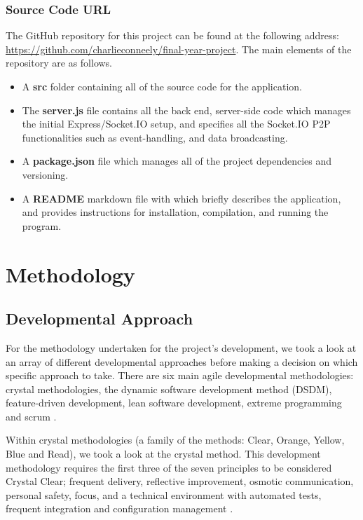 \subsection{Source Code URL} 
The GitHub repository for this project can be found at the following address: \href{https://github.com/charlieconneely/final-year-project}{https://github.com/charlieconneely/final-year-project}. \newline 
The main elements of the repository are as follows.
\begin{itemize}
    \item A \textbf{src} folder containing all of the source code for the application. 
    \item The \textbf{server.js} file contains all the back end, server-side code which manages the initial Express/Socket.IO setup, and specifies all the Socket.IO P2P functionalities such as event-handling, and data broadcasting.    
    \item A \textbf{package.json} file which manages all of the project dependencies and versioning. 
    \item A \textbf{README} markdown file with which briefly describes the application, and provides instructions for installation, compilation, and running the program.  
\end{itemize}

\chapter{Methodology}
\section{Developmental Approach}
For the methodology undertaken for the project’s development, we took a look at an array of different developmental approaches before making a decision on which specific approach to take. 
There are six main agile developmental methodologies: crystal methodologies, the dynamic software development method (DSDM), feature-driven development, lean software development, extreme programming and scrum \cite{dybaa2008empirical}. 

Within crystal methodologies (a family of the methods: Clear, Orange, Yellow, Blue and Read), we took a look at the crystal method. This development methodology requires the first three of the seven principles to be considered Crystal Clear; frequent delivery, reflective improvement, osmotic communication, personal safety, focus, and a technical environment with automated tests, frequent integration and configuration management \cite{cockburn2004crystal}.


